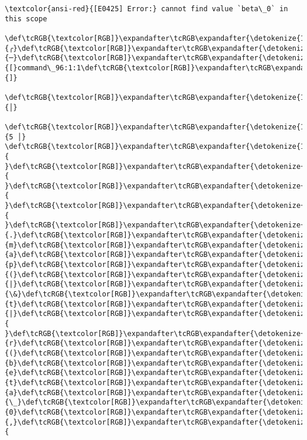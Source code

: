 \documentclass[11pt]{article}
\begin{document}
    \begin{Verbatim}[commandchars=\\\{\}, frame=single, framerule=2mm, rulecolor=\color{outerrorbackground}]
\textcolor{ansi-red}{[E0425] Error:} cannot find value `beta\_0` in this scope
   \def\tcRGB{\textcolor[RGB]}\expandafter\tcRGB\expandafter{\detokenize{148,148,148}}{╭}\def\tcRGB{\textcolor[RGB]}\expandafter\tcRGB\expandafter{\detokenize{148,148,148}}{─}\def\tcRGB{\textcolor[RGB]}\expandafter\tcRGB\expandafter{\detokenize{148,148,148}}{[}command\_96:1:1\def\tcRGB{\textcolor[RGB]}\expandafter\tcRGB\expandafter{\detokenize{148,148,148}}{]}
   \def\tcRGB{\textcolor[RGB]}\expandafter\tcRGB\expandafter{\detokenize{148,148,148}}{│}
 \def\tcRGB{\textcolor[RGB]}\expandafter\tcRGB\expandafter{\detokenize{148,148,148}}{5 │} \def\tcRGB{\textcolor[RGB]}\expandafter\tcRGB\expandafter{\detokenize{178,178,178}}{ }\def\tcRGB{\textcolor[RGB]}\expandafter\tcRGB\expandafter{\detokenize{178,178,178}}{ }\def\tcRGB{\textcolor[RGB]}\expandafter\tcRGB\expandafter{\detokenize{178,178,178}}{ }\def\tcRGB{\textcolor[RGB]}\expandafter\tcRGB\expandafter{\detokenize{178,178,178}}{ }\def\tcRGB{\textcolor[RGB]}\expandafter\tcRGB\expandafter{\detokenize{178,178,178}}{.}\def\tcRGB{\textcolor[RGB]}\expandafter\tcRGB\expandafter{\detokenize{178,178,178}}{m}\def\tcRGB{\textcolor[RGB]}\expandafter\tcRGB\expandafter{\detokenize{178,178,178}}{a}\def\tcRGB{\textcolor[RGB]}\expandafter\tcRGB\expandafter{\detokenize{178,178,178}}{p}\def\tcRGB{\textcolor[RGB]}\expandafter\tcRGB\expandafter{\detokenize{178,178,178}}{(}\def\tcRGB{\textcolor[RGB]}\expandafter\tcRGB\expandafter{\detokenize{178,178,178}}{|}\def\tcRGB{\textcolor[RGB]}\expandafter\tcRGB\expandafter{\detokenize{178,178,178}}{\&}\def\tcRGB{\textcolor[RGB]}\expandafter\tcRGB\expandafter{\detokenize{178,178,178}}{t}\def\tcRGB{\textcolor[RGB]}\expandafter\tcRGB\expandafter{\detokenize{178,178,178}}{|}\def\tcRGB{\textcolor[RGB]}\expandafter\tcRGB\expandafter{\detokenize{178,178,178}}{ }\def\tcRGB{\textcolor[RGB]}\expandafter\tcRGB\expandafter{\detokenize{178,178,178}}{r}\def\tcRGB{\textcolor[RGB]}\expandafter\tcRGB\expandafter{\detokenize{178,178,178}}{(}\def\tcRGB{\textcolor[RGB]}\expandafter\tcRGB\expandafter{\detokenize{95,0,135}}{b}\def\tcRGB{\textcolor[RGB]}\expandafter\tcRGB\expandafter{\detokenize{95,0,135}}{e}\def\tcRGB{\textcolor[RGB]}\expandafter\tcRGB\expandafter{\detokenize{95,0,135}}{t}\def\tcRGB{\textcolor[RGB]}\expandafter\tcRGB\expandafter{\detokenize{95,0,135}}{a}\def\tcRGB{\textcolor[RGB]}\expandafter\tcRGB\expandafter{\detokenize{95,0,135}}{\_}\def\tcRGB{\textcolor[RGB]}\expandafter\tcRGB\expandafter{\detokenize{95,0,135}}{0}\def\tcRGB{\textcolor[RGB]}\expandafter\tcRGB\expandafter{\detokenize{178,178,178}}{,}\def\tcRGB{\textcolor[RGB]}\expandafter\tcRGB\expandafter{\detokenize{178,178,178}}{ 
\end{Verbatim}
\end{document}

